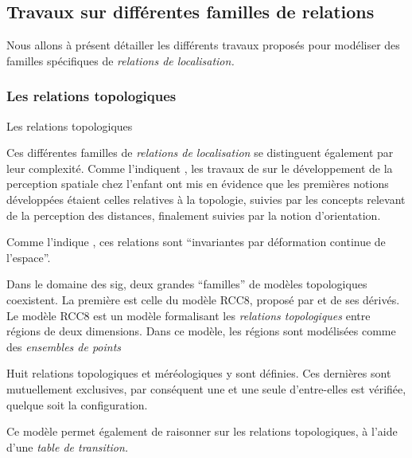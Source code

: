 \subsection{Travaux sur différentes familles de relations}

Nous allons à présent détailler les différents travaux proposés pour
modéliser des familles spécifiques de \emph{relations de
  localisation.}

\subsubsection{Les relations topologiques}

Les relations topologiques 

Ces différentes familles de \emph{relations de localisation} se
distinguent également par leur complexité. Comme l'indiquent
\textcite{Aurnague1997}, les travaux de \textcite{Piaget1948} sur le
développement de la perception spatiale chez l'enfant ont mis en
évidence que les premières notions développées étaient celles
relatives à la topologie, suivies par les concepts relevant de la
perception des distances, finalement suivies par la notion
d'orientation.

Comme l'indique \textcite{Duchene2019}, ces relations sont
\enquote{invariantes par déformation continue de l’espace}.




Dans le domaine des \ac{sig}, deux grandes \enquote{familles} de
modèles topologiques coexistent. La première est celle du modèle RCC8,
proposé par \textcite{Randell1992} et de ses dérivés. Le modèle RCC8
est un modèle formalisant les \emph{relations topologiques} entre
régions de deux dimensions. Dans ce modèle, les régions sont
modélisées comme des \emph{ensembles de points}


Huit relations topologiques et méréologiques y sont définies. Ces
dernières sont mutuellement exclusives, par conséquent une et une
seule d'entre-elles est vérifiée, quelque soit la configuration.

Ce modèle permet également de raisonner sur les relations
topologiques, à l'aide d'une \emph{table de transition.}


